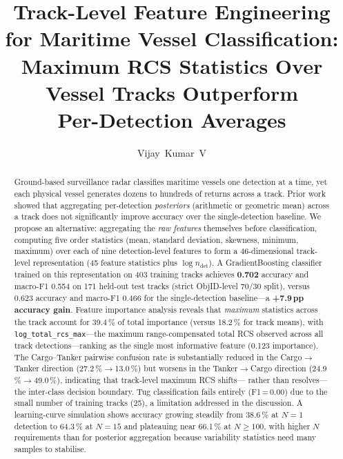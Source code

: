 \documentclass[10pt,journal,compsoc]{IEEEtran}
\begin{document}
\title{Track-Level Feature Engineering for Maritime Vessel Classification:\\
Maximum RCS Statistics Over Vessel Tracks Outperform\\
Per-Detection Averages}

\author{Vijay~Kumar~V\\
}

\maketitle

\begin{abstract}
Ground-based surveillance radar classifies maritime vessels one detection at a time,
yet each physical vessel generates dozens to hundreds of returns across a track.
Prior work showed that aggregating per-detection \emph{posteriors} (arithmetic or
geometric mean) across a track does not significantly improve accuracy over the
single-detection baseline.  We propose an alternative: aggregating the \emph{raw
features} themselves before classification, computing five order statistics
(mean, standard deviation, skewness, minimum, maximum) over each of nine
detection-level features to form a 46-dimensional track-level representation
(45 feature statistics plus $\log n_{\mathrm{det}}$).  A GradientBoosting
classifier trained on this representation on 403 training tracks achieves
\textbf{0.702} accuracy and macro-F1 0.554 on 171 held-out test tracks
(strict ObjID-level 70/30 split), versus 0.623 accuracy and macro-F1 0.466
for the single-detection baseline---a \textbf{+7.9\,pp accuracy gain}.
Feature importance analysis reveals that \emph{maximum} statistics across the track
account for 39.4\,\% of total importance (versus 18.2\,\% for track means),
with \texttt{log\_total\_rcs\_max}---the maximum range-compensated total RCS
observed across all track detections---ranking as the single most informative
feature (0.123 importance).  The Cargo--Tanker pairwise confusion rate
is substantially reduced in the Cargo$\to$Tanker direction
(27.2\,\%$\to$13.0\,\%) but worsens in the Tanker$\to$Cargo direction
(24.9\,\%$\to$49.0\,\%), indicating that track-level maximum RCS shifts---
rather than resolves---the inter-class decision boundary.  Tug classification
fails entirely (F1\,=\,0.00) due to the small number of training tracks (25),
a limitation addressed in the discussion.  A learning-curve simulation shows
accuracy growing steadily from 38.6\,\% at $N=1$ detection to 64.3\,\%
at $N=15$ and plateauing near 66.1\,\% at $N\geq 100$, with higher
$N$ requirements than for posterior aggregation because variability statistics
need many samples to stabilise.
\end{abstract}
\end{document}
